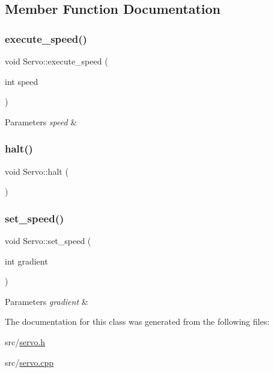 \subsection{Member Function Documentation}
\mbox{\label{class_servo_af6eeaa06f8e1d8ce24015d057be7dc20}} 
\subsubsection{\texorpdfstring{execute\+\_\+speed()}{execute\_speed()}}
{\footnotesize\ttfamily void Servo\+::execute\+\_\+speed (\begin{DoxyParamCaption}\item[{int}]{speed }\end{DoxyParamCaption})}


\begin{DoxyParams}{Parameters}
{\em speed} & \\
\hline
\end{DoxyParams}
\mbox{\label{class_servo_a2219362602b79927b5fbd6343799f217}} 
\subsubsection{\texorpdfstring{halt()}{halt()}}
{\footnotesize\ttfamily void Servo\+::halt (\begin{DoxyParamCaption}{ }\end{DoxyParamCaption})}

\mbox{\label{class_servo_aecca91f485fc36404ce8cdfcb95f0527}} 
\subsubsection{\texorpdfstring{set\+\_\+speed()}{set\_speed()}}
{\footnotesize\ttfamily void Servo\+::set\+\_\+speed (\begin{DoxyParamCaption}\item[{int}]{gradient }\end{DoxyParamCaption})}


\begin{DoxyParams}{Parameters}
{\em gradient} & \\
\hline
\end{DoxyParams}


The documentation for this class was generated from the following files\+:\begin{DoxyCompactItemize}
\item 
src/\mbox{\hyperlink{servo_8h}{servo.\+h}}\item 
src/\mbox{\hyperlink{servo_8cpp}{servo.\+cpp}}\end{DoxyCompactItemize}
